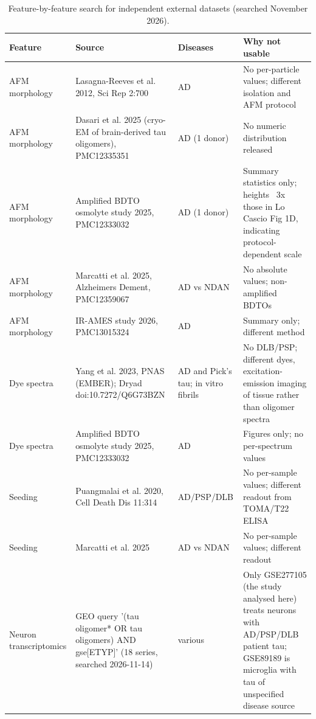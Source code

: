 \begin{table}[!htbp]
\centering\scriptsize
\caption{Feature-by-feature search for independent external datasets (searched November 2026).}\label{tab:s_external}
\begin{tabular}{p{2.0cm}p{4.6cm}p{2.0cm}p{4.6cm}}
\toprule
\textbf{Feature} & \textbf{Source} & \textbf{Diseases} & \textbf{Why not usable} \\
\midrule
AFM morphology & Lasagna-Reeves et al. 2012, Sci Rep 2:700 & AD & No per-particle values; different isolation and AFM protocol \\
AFM morphology & Dasari et al. 2025 (cryo-EM of brain-derived tau oligomers), PMC12335351 & AD (1 donor) & No numeric distribution released \\
AFM morphology & Amplified BDTO osmolyte study 2025, PMC12333032 & AD (1 donor) & Summary statistics only; heights ~3x those in Lo Cascio Fig 1D, indicating protocol-dependent scale \\
AFM morphology & Marcatti et al. 2025, Alzheimers Dement, PMC12359067 & AD vs NDAN & No absolute values; non-amplified BDTOs \\
AFM morphology & IR-AMES study 2026, PMC13015324 & AD & Summary only; different method \\
Dye spectra & Yang et al. 2023, PNAS (EMBER); Dryad doi:10.7272/Q6G73BZN & AD and Pick's tau; in vitro fibrils & No DLB/PSP; different dyes, excitation-emission imaging of tissue rather than oligomer spectra \\
Dye spectra & Amplified BDTO osmolyte study 2025, PMC12333032 & AD & Figures only; no per-spectrum values \\
Seeding & Puangmalai et al. 2020, Cell Death Dis 11:314 & AD/PSP/DLB & No per-sample values; different readout from TOMA/T22 ELISA \\
Seeding & Marcatti et al. 2025 & AD vs NDAN & No per-sample values; different readout \\
Neuron transcriptomics & GEO query '(tau oligomer* OR tau oligomers) AND gse[ETYP]' (18 series, searched 2026-11-14) & various & Only GSE277105 (the study analysed here) treats neurons with AD/PSP/DLB patient tau; GSE89189 is microglia with tau of unspecified disease source \\
\bottomrule
\end{tabular}
\end{table}

